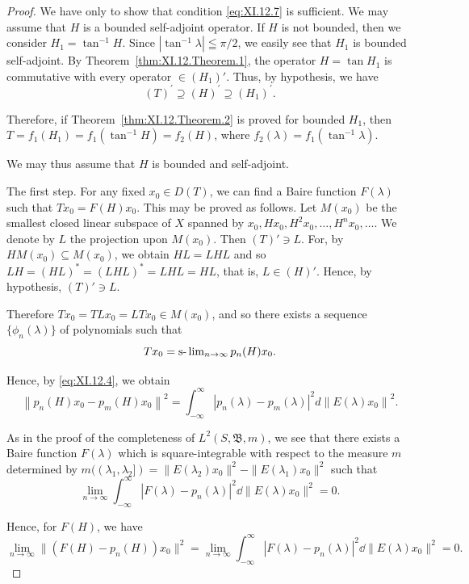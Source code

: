 \begin{proof}
 We have only to show that condition \eqref{eq:XI.12.7} is sufficient. We may assume that $H$ is a bounded self-adjoint operator. If $H$ is not bounded, then we consider $H_{1} = \tan^{-1}H$. Since $|\tan^{-1}\lambda| \leqq \pi/2$, we easily see that $H_{1}$ is bounded self-adjoint. By Theorem~\ref{thm:XI.12.Theorem.1}, the operator $H = \tan H_{1}$ is commutative with every operator $\in (H_{1})'$. Thus, by hypothesis, we have 
\[
(T) ^{\prime} \supseteq (H) ^{\prime} \supseteq (H _{1}) ^{\prime}. \]

Therefore, if Theorem~\ref{thm:XI.12.Theorem.2} is proved for bounded $H_{1}$, then $T = f_{1}(H_{1}) = f_{1}(\tan^{-1}H) = f_{2}(H)$, where $f_{2}(\lambda) = f_{1}(\tan^{-1}\lambda)$. 

We may thus assume that $H$ is bounded and self-adjoint. 

The first step. For any fixed $x_0 \in D(T)$, we can find a Baire function $F(\lambda)$ such that $Tx_0 = F(H)x_0$. This may be proved as follows. Let $M(x_0)$ be the smallest closed linear subspace of $X$ spanned by $x_0, Hx_0, H^2x_0, \ldots, H^n x_0, \ldots$. We denote by $L$ the projection upon $M(x_0)$. Then $(T)' \ni L$. For, by $HM(x_0) \subseteq M(x_0)$, we obtain $HL = LHL$ and so $LH = (HL)^* = (LHL)^* = LHL = HL$, that is, $L \in (H)'$. Hence, by hypothesis, $(T)' \ni L$. 

Therefore $Tx_{0}=TLx_{0}=LTx_{0}\in M(x_{0})$, and so there exists a sequence $\{\phi_{n}(\lambda)\}$ of polynomials such that 
\begin{equation}\label{eq:XI.12.8}
T x _{0} = \text{s-}\lim\nolimits_{n \rightarrow \infty} p _{n} (H) x _{0}.
\end{equation}

Hence, by \eqref{eq:XI.12.4}, we obtain 
\[
\left\| p _{n} (H) x _{0} - p _{m} (H) x _{0} \right\| ^{2} = \int_{- \infty} ^{\infty} \left| p _{n} (\lambda) - p _{m} (\lambda) \right| ^{2} d \left\| E (\lambda) x _{0} \right\| ^{2}.
\]

As in the proof of the completeness of $L^{2}(S, \mathfrak{B}, m)$, we see that there exists a Baire function $F(\lambda)$ which is square-integrable with respect to the measure $m$ determined by $m((\lambda_{1}, \lambda_{2}]) = \|E(\lambda_{2}) x_{0}\|^{2} - \|E(\lambda_{1}) x_{0}\|^{2}$ such that 
\[
\lim\limits _{n \rightarrow \infty} \int_{- \infty} ^{\infty} | F (\lambda) - p _{n} (\lambda) | ^{2} \dd \| E (\lambda) x _{0} \| ^{2} = 0.
\]

Hence, for $F(H)$, we have 
\[
\lim\limits _{n \rightarrow \infty} \| (F (H) - p _{n} (H)) x _{0} \| ^{2} = \lim\limits _{n \rightarrow \infty} \int_{- \infty} ^{\infty} | F (\lambda) - p _{n} (\lambda) | ^{2} \dd \| E (\lambda) x _{0} \| ^{2} = 0.
\]


\end{proof}
